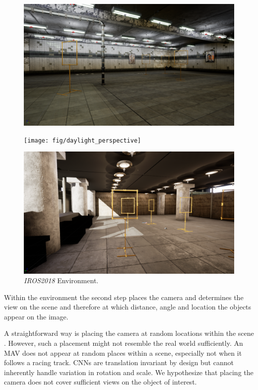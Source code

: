 \begin{figure}[hbtp]
	\centering
	\begin{minipage}{0.3\textwidth}
		\includegraphics[width=\textwidth]{fig/basement_perspective}
	\end{minipage}
	\begin{minipage}{0.3\textwidth}
		\texttt{[image: fig/daylight\_perspective]}
	\end{minipage}
	\begin{minipage}{0.3\textwidth}
		\includegraphics[width=\textwidth]{fig/iros_perspective}
	\end{minipage}
	\caption{\textit{IROS2018} Environment.}
	\label{fig:environments}
\end{figure}

Within the environment the second step places the camera and determines the view on the scene and therefore at which distance, angle and location the objects appear on the image.

A straightforward way is placing the camera at random locations within the scene . However, such a placement might not resemble the real world sufficiently. An \ac{MAV} does not appear at random places within a scene, especially not when it follows a racing track. \acp{CNN} are translation invariant by design but cannot inherently handle variation in rotation and scale. We hypothesize that placing the camera does not cover sufficient views on the object of interest. 

